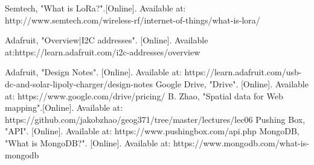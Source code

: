 \documentclass[onecolumn, draftclsnofoot,10pt, compsoc]{IEEEtran}
\begin{document}
\newpage
\begin{thebibliography}{1}
Semtech, "What is LoRa?".[Online]. Available at: http://www.semtech.com/wireless-rf/internet-of-things/what-is-lora/


Adafruit, "Overview|I2C addresses". [Online]. Available at:https://learn.adafruit.com/i2c-addresses/overview

Adafruit, "Design Notes". [Online]. Available at: https://learn.adafruit.com/usb-dc-and-solar-lipoly-charger/design-notes
Google Drive, "Drive". [Online]. Available at: https://www.google.com/drive/pricing/
B. Zhao,  "Spatial data for Web mapping".[Online]. Available at: https://github.com/jakobzhao/geog371/tree/master/lectures/lec06
Pushing Box, "API". [Online]. Available at: https://www.pushingbox.com/api.php
MongoDB, "What is MongoDB?". [Online]. Available at: https://www.mongodb.com/what-is-mongodb

\end{thebibliography}
\end{document}
